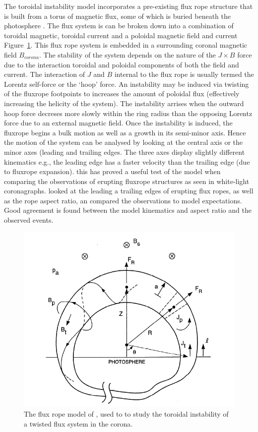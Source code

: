 The toroidal instability model incorporates a pre-existing flux rope structure that is built from a torus of magnetic flux, some of which is buried beneath the photosphere \citep{chen1989}. The flux system is can be broken down into a combination of toroidal magnetic, toroidal current and a poloidal magnetic field and current Figure~\ref{fig:chen_model}. This flux rope system is embedded in a surrounding coronal magnetic field $B_{corona}$. The stability of the system depends on the nature of the $J \times B$ force due to the interaction toroidal and poloidal components of both the field and current. The interaction of $J$ and $B$ internal to the flux rope is usually termed the Lorentz self-force or the \textquoteleft hoop' force. An instability may be induced via twisting of the fluxrope footpoints to increases the amount of poloidal flux (effectively increasing the helicity of the system). The instability arrises when the outward hoop force decreses more slowly within the ring radius than the opposing Lorentz force due to an external magnetic field. Once the instability is induced, the fluxrope begins a bulk motion as well as a growth in its semi-minor axis. Hence the motion of the system can be analysed by looking at the central axis or the minor axes (leading and trailing edges. The three axes display slightly different kinematics e.g., the leading edge has a faster velocity than the trailing edge (due to fluxrope expansion). this has proved a useful test of the model when comparing the observations of erupting fluxrope structures as seen in white-light coronagraphs. \citet{krall2001} looked at the leading a trailing edges of erupting flux ropes, as well as the rope aspect ratio, an compared the observations to model expectations. Good agreement is found between the model kinematics and aspect ratio and the observed events.
\begin{figure}[!t]
\begin{center}
\includegraphics[scale=0.4, trim=0cm 1cm 0cm 1cm]{images/chen_model}
\caption[The toroidal instability CME model]{The flux rope model of \citet{chen1989}, used to to study the toroidal instability of a twisted flux system in the corona.}
\label{fig:chen_model}
\end{center}
\end{figure}
